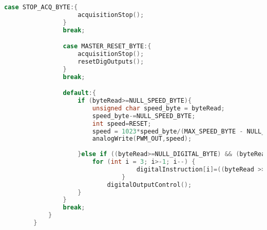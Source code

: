 \begin{lstlisting}[language=C]
				case STOP_ACQ_BYTE:{
					acquisitionStop();
				}
				break;

				case MASTER_RESET_BYTE:{
					acquisitionStop();
					resetDigOutputs();
				}
				break;

				default:{
					if (byteRead>=NULL_SPEED_BYTE){
						unsigned char speed_byte = byteRead;
						speed_byte-=NULL_SPEED_BYTE;
						int speed=RESET;
						speed = 1023*speed_byte/(MAX_SPEED_BYTE - NULL_SPEED_BYTE);
						analogWrite(PWM_OUT,speed);
						
					}else if ((byteRead>=NULL_DIGITAL_BYTE) && (byteRead<=MAX_DIGITAL_BYTE)){
						for (int i = 3; i>-1; i--) {
									digitalInstruction[i]=((byteRead >> i) & 1);
								}
							digitalOutputControl();
					}
				}
				break;
			}
		}
	\end{lstlisting}
